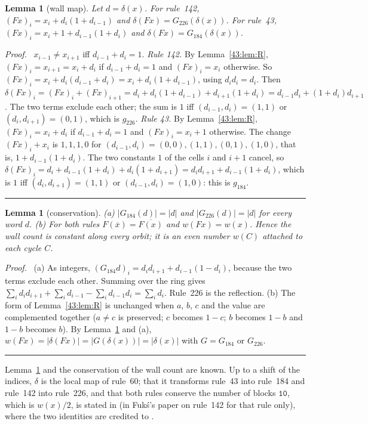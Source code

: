 \documentclass[10pt,a4paper]{article}
\newtheorem{lemma}[theorem]{Lemma}
\newcommand{\qedmark}{\rule{1.1ex}{1.1ex}}
\newenvironment{proof}[1][Proof]{\par\smallskip\noindent\textit{#1.}\ }{\hfill\qedmark\par\smallskip}
\newcommand{\cpl}[1]{\overline{#1}}           %
\newcommand{\code}[1]{\mathtt{#1}}            %
\begin{document}
\begin{lemma}[wall map]\label{43:lem:wall}
Let $d=\delta(x)$. For rule~142, $(Fx)_i=x_i+d_i(1+d_{i-1})$ and $\delta(Fx)=G_{226}(\delta(x))$. For rule~43,
$(Fx)_i=x_i+1+d_{i-1}(1+d_i)$ and $\delta(Fx)=G_{184}(\delta(x))$.
\end{lemma}
\begin{proof}
$x_{i-1}\ne x_{i+1}$ iff $d_{i-1}+d_i=1$.
\emph{Rule 142.} By Lemma~\ref{43:lem:R}, $(Fx)_i=x_{i+1}=x_i+d_i$ if $d_{i-1}+d_i=1$ and $(Fx)_i=x_i$
otherwise. So $(Fx)_i=x_i+d_i(d_{i-1}+d_i)=x_i+d_i(1+d_{i-1})$, using $d_id_i=d_i$. Then
$\delta(Fx)_i=(Fx)_i+(Fx)_{i+1}=d_i+d_i(1+d_{i-1})+d_{i+1}(1+d_i)=d_{i-1}d_i+(1+d_i)d_{i+1}$. The two terms
exclude each other; the sum is $1$ iff $(d_{i-1},d_i)=(1,1)$ or $(d_i,d_{i+1})=(0,1)$, which is $g_{226}$.
\emph{Rule 43.} By Lemma~\ref{43:lem:R}, $(Fx)_i=x_i+d_i$ if $d_{i-1}+d_i=1$ and $(Fx)_i=x_i+1$ otherwise. The
change $(Fx)_i+x_i$ is $1,1,1,0$ for $(d_{i-1},d_i)=(0,0),(1,1),(0,1),(1,0)$, that is, $1+d_{i-1}(1+d_i)$. The
two constants $1$ of the cells $i$ and $i+1$ cancel, so
$\delta(Fx)_i=d_i+d_{i-1}(1+d_i)+d_i(1+d_{i+1})=d_id_{i+1}+d_{i-1}(1+d_i)$, which is $1$ iff
$(d_i,d_{i+1})=(1,1)$ or $(d_{i-1},d_i)=(1,0)$: this is $g_{184}$.
\end{proof}

\begin{lemma}[conservation]\label{43:lem:cons}
(a) $|G_{184}(d)|=|d|$ and $|G_{226}(d)|=|d|$ for every word $d$.
(b) For both rules $F(\cpl{x})=\cpl{F(x)}$ and $w(Fx)=w(x)$. Hence the wall count is constant along every orbit;
it is an even number $w(C)$ attached to each cycle $C$.
\end{lemma}
\begin{proof}
(a) As integers, $(G_{184}d)_i=d_id_{i+1}+d_{i-1}(1-d_i)$, because the two terms exclude each other. Summing over
the ring gives $\sum_i d_id_{i+1}+\sum_i d_{i-1}-\sum_i d_{i-1}d_i=\sum_i d_i$. Rule~226 is the reflection.
(b) The form of Lemma~\ref{43:lem:R} is unchanged when $a$, $b$, $c$ and the value are complemented together
($a\ne c$ is preserved; $c$ becomes $1-c$; $b$ becomes $1-b$ and $1-b$ becomes $b$). By
Lemma~\ref{43:lem:wall} and (a), $w(Fx)=|\delta(Fx)|=|G(\delta(x))|=|\delta(x)|$ with $G=G_{184}$ or $G_{226}$.
\end{proof}

Lemma~\ref{43:lem:wall} and the conservation of the wall count are known. Up to a shift of the indices,
$\delta$ is the local map of rule~60; that it transforms rule~43 into rule~184 and rule~142 into rule~226, and
that both rules conserve the number of blocks $\code{10}$, which is $w(x)/2$, is stated in
\cite{Fuks2005,Fuks2005b} (in Fuk\'s's paper on rule~142 for that rule only), where the two identities are
credited to \cite{Boccara1993}.
\end{document}

